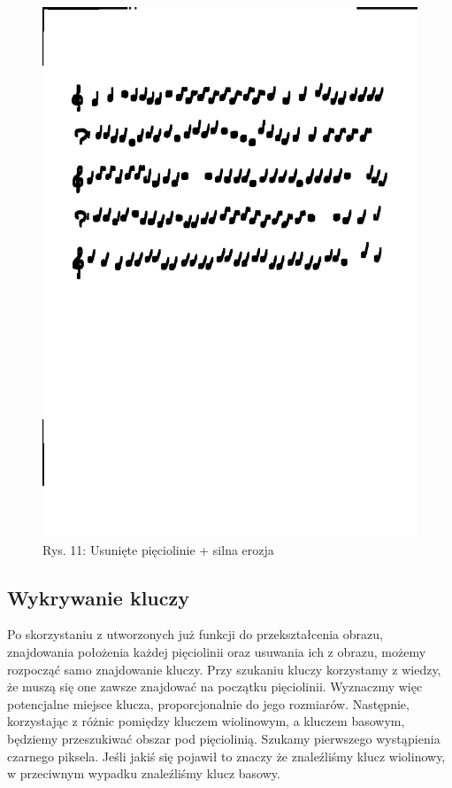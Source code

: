 \documentclass[11pt]{article}
\begin{document}
\captionsetup[figure]{labelformat=empty}
\begin{figure}[H]
    \centering
    \graphicspath{ {blobs/} }
    \includegraphics[scale=0.15]{4.jpg}
    \caption{Rys. 11: Usunięte pięciolinie + silna erozja}
    \label{fig:universe}
    \end{figure}

\subsection{Wykrywanie kluczy}
Po skorzystaniu z utworzonych już funkcji do przekształcenia obrazu, znajdowania położenia każdej pięciolinii oraz usuwania ich z obrazu, możemy rozpocząć samo znajdowanie kluczy.
Przy szukaniu kluczy korzystamy z wiedzy, że muszą się one zawsze znajdować na początku pięciolinii. Wyznaczmy więc potencjalne miejsce klucza, proporcjonalnie do jego rozmiarów.
Następnie, korzystając z różnic pomiędzy kluczem wiolinowym, a kluczem basowym, będziemy przeszukiwać obszar pod pięciolinią. Szukamy pierwszego wystąpienia czarnego piksela. Jeśli jakiś się pojawił to znaczy że znaleźliśmy klucz wiolinowy, w przeciwnym wypadku znaleźliśmy klucz basowy.
\end{document}
